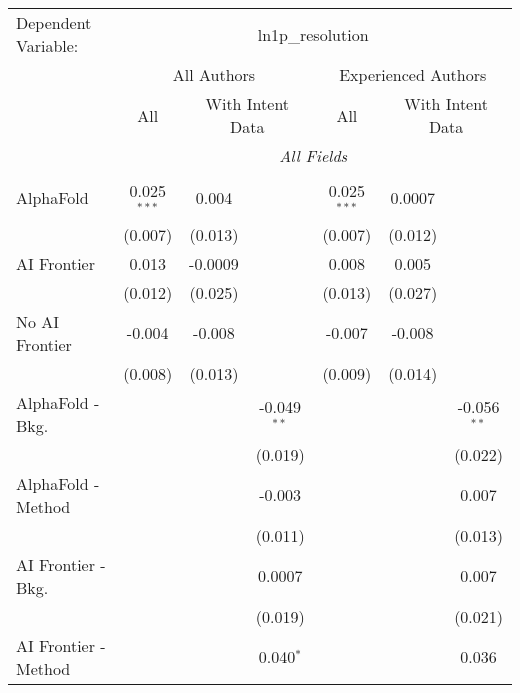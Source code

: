 \begingroup
\centering
\begin{tabular}{lcccccc}
   \tabularnewline \midrule \midrule
   Dependent Variable: & \multicolumn{6}{c}{ln1p\_resolution}\\
 & \multicolumn{3}{c}{All Authors} & \multicolumn{3}{c}{Experienced Authors} \\
\cmidrule(lr){2-4} \cmidrule(lr){5-7}
 & \multicolumn{1}{c}{All} & \multicolumn{2}{c}{With Intent Data} & \multicolumn{1}{c}{All} & \multicolumn{2}{c}{With Intent Data} \\
\cmidrule(lr){2-2} \cmidrule(lr){3-4} \cmidrule(lr){5-5} \cmidrule(lr){6-7}
 & \multicolumn{6}{c}{\textit{All Fields}} \\ \\
   AlphaFold               & 0.025$^{***}$ & 0.004   &               & 0.025$^{***}$ & 0.0007  &   \\   
                           & (0.007)       & (0.013) &               & (0.007)       & (0.012) &   \\   
   AI Frontier             & 0.013         & -0.0009 &               & 0.008         & 0.005   &   \\   
                           & (0.012)       & (0.025) &               & (0.013)       & (0.027) &   \\   
   No AI Frontier          & -0.004        & -0.008  &               & -0.007        & -0.008  &   \\   
                           & (0.008)       & (0.013) &               & (0.009)       & (0.014) &   \\   
   AlphaFold - Bkg.        &               &         & -0.049$^{**}$ &               &         & -0.056$^{**}$\\   
                           &               &         & (0.019)       &               &         & (0.022)\\   
   AlphaFold - Method      &               &         & -0.003        &               &         & 0.007\\   
                           &               &         & (0.011)       &               &         & (0.013)\\   
   AI Frontier - Bkg.      &               &         & 0.0007        &               &         & 0.007\\   
                           &               &         & (0.019)       &               &         & (0.021)\\   
   AI Frontier - Method    &               &         & 0.040$^{*}$   &               &         & 0.036\\   

\end{tabular}
